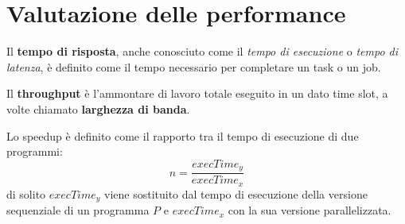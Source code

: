 \section{Valutazione delle performance}
Il \textbf{tempo di risposta}, anche conosciuto come il \emph{tempo di esecuzione} o \emph{tempo di latenza}, è definito come il tempo necessario per completare un task o un job.

Il \textbf{throughput} è l'ammontare di lavoro totale eseguito in un dato time slot, a volte chiamato \textbf{larghezza di banda}.

Lo speedup è definito come il rapporto tra il tempo di esecuzione di due programmi:
\begin{equation*}
	n=\frac{execTime_y}{execTime_x}
\end{equation*}
di solito $execTime_y$ viene sostituito dal tempo di esecuzione della versione sequenziale di un programma $P$ e $execTime_x$ con la sua versione parallelizzata.